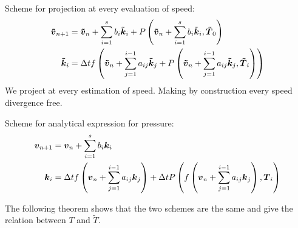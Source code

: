 Scheme for projection at every evaluation of speed:
\begin{subequations}
\begin{align}
{\boldsymbol {\tilde{v}}}_{n+1}&={\boldsymbol {\tilde{v}}}_{n}+\sum_{i=1}^{s}b_{i}{\boldsymbol {\tilde{k}}}_{i}+P\left({\boldsymbol {\tilde{v}}}_{n}+\sum_{i=1}^{s}b_{i}{\boldsymbol {\tilde{k}}}_{i},{\boldsymbol {\tilde{T}}}_0\right)\\
{\boldsymbol {\tilde{k}}}_{i}&=\Delta t f\left({\boldsymbol {\tilde{v}}}_{n}+\sum_{j=1}^{i-1}a_{ij}{\boldsymbol {\tilde{k}}}_{j}+P\left({\boldsymbol {\tilde{v}}}_{n}+\sum_{j=1}^{i-1}a_{ij}{\boldsymbol {\tilde{k}}}_{j},{\boldsymbol {\tilde{T}}}_i\right)\right)
\end{align}
\end{subequations}
We project at every estimation of speed. Making by construction every speed divergence free.

Scheme for analytical expression for pressure:
\begin{subequations}
\begin{align}
	{\boldsymbol {v}}_{n+1}&={\boldsymbol {v}}_{n}+\sum_{i=1}^{s}b_{i}{\boldsymbol {k}}_{i}\\
	{\boldsymbol {k}}_{i}&=\Delta t f\left({\boldsymbol {v}}_{n}+\sum_{j=1}^{i-1}a_{ij}{\boldsymbol {k}}_{j}\right)+\Delta t P\left(f\left({\boldsymbol {v}}_{n}+\sum_{j=1}^{i-1}a_{ij}{\boldsymbol {k}}_{j}\right),{\boldsymbol {T}}_{i}\right)
\end{align}
\end{subequations}

The following theorem shows that the two schemes are the same and give the relation between $T$ and $\tilde{T}$.

